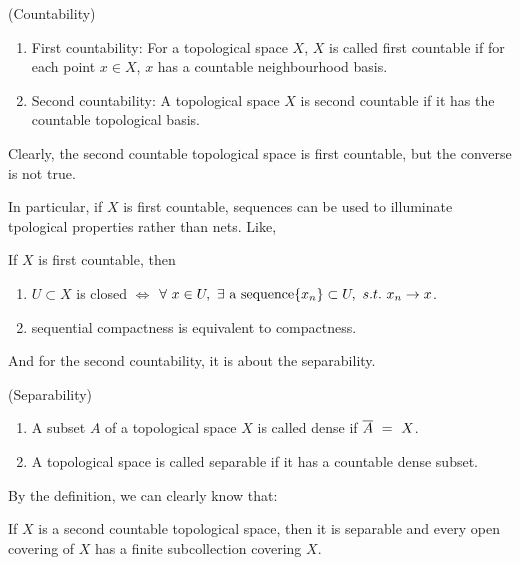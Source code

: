 \documentclass[a4paper,11pt]{report}
\begin{document}
\begin{defn}
	(Countability)
	\begin{enumerate}[label=\arabic*)]
		\item First countability: For a topological space $X$, $X$ is called first countable if for each point $x \in X$, $x$ has a countable neighbourhood basis.
		\item Second countability: A topological space $X$ is second countable if it has the countable topological basis. 
	\end{enumerate}
\end{defn}
\begin{rem}
	Clearly, the second countable topological space is first countable, but the converse is not true.
\end{rem}
In particular, if $X$ is first countable, sequences can be used to illuminate tpological properties rather than nets. Like,
\begin{prop}
	If $X$ is first countable, then
	\begin{enumerate}[label=\arabic*)]
		\item $U \subset X$ is closed $\Leftrightarrow$ $\forall ~ x \in U,~ \exists ~\text{a sequence} \{x_n\} \subset U,~ s.t.~ x_n \rightarrow x$.
		\item sequential compactness is equivalent to compactness.
	\end{enumerate}
\end{prop}

And for the second countability, it is about the separability.
\begin{defn}
	(Separability)
	\begin{enumerate}[label=\arabic*)]
		\item A subset $A$ of a topological space $X$ is called dense if $\overline{A} ~=~ X$.
		\item A topological space is called separable if it has a countable dense subset.
	\end{enumerate}
\end{defn}

By the definition, we can clearly know that:
\begin{prop}
	If $X$ is a second countable topological space, then it is separable and every open covering of $X$ has a finite subcollection covering $X$.
\end{prop}
\end{document}
